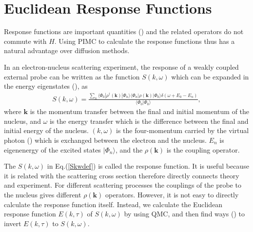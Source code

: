 \documentclass[12pt,letterpaper,UTF8]{report}
\begin{document}
\section{Euclidean Response Functions}
\label{SECresponse}

Response functions are important quantities (\cite{Carlson92a, Benhar1994book, Carlson94a, Carlson02a,sick2003meson,Lovato13a,Lovato15a}) and the related operators do not commute with $H$. Using PIMC to calculate the response functions thus has a natural advantage over diffusion methods.

In an electron-nucleus scattering experiment, the response of a weakly coupled external probe can be written as the function $S(k,\omega)$ which can be expanded in the energy eigenstates (\cite{Carlson94a}), as
\begin{eqnarray}
S(k,\omega)=\frac{\sum_n \langle \Phi_0 | \rho^\dagger(\bm{k}) | \Phi_n \rangle \langle \Phi_n | \rho(\bm{k})| \Phi_0 \rangle  \delta(\omega+E_0-E_n)  }{\langle \Phi_0 | \Phi_0 \rangle} ,
\label{Skwdef}
\end{eqnarray}
where $\bm{k}$ is the momentum transfer between the final and initial momentum of the nucleus, and $\omega$ is the energy transfer which is the difference between the final and initial energy of the nucleus.
$(k,\omega)$ is the four-momentum carried by the virtual photon (\cite{Bacca2014JPG}) which is exchanged between the electron and the nucleus. $E_n$ is eigenenergy of the excited states $|\Phi_n \rangle$, and the $\rho(\bm{k})$ is the coupling operator.

The $S(k,\omega)$ in Eq.(\ref{Skwdef}) is called the response function.
It is useful because it is related with the scattering cross section therefore directly connects theory and experiment.
For different scattering processes the couplings of the probe to the nucleus gives different $\rho(\bm{k})$ operators.
However, it is not easy to directly calculate the response function itself.
Instead, we calculate the Euclidean response function $E(k,\tau)$ of $S(k,\omega)$ by using QMC, and then find ways (\cite{GShen2012PRC,Lovato15a}) to invert $E(k,\tau)$ to $S(k,\omega)$.
\end{document}
